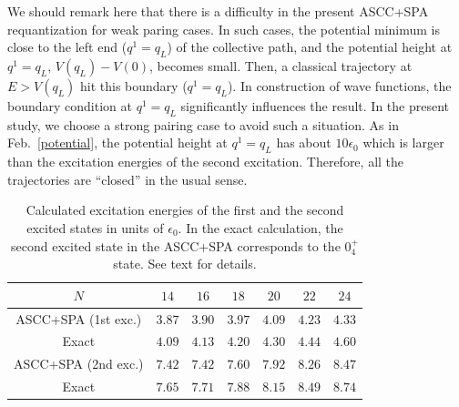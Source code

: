 \documentclass[%
superscriptaddress,
showpacs,
nofootinbib,
amsmath,amssymb,
aps,
prc,
twocolumn,
floatfix ]%
{revtex4-1}
\begin{document}
We should remark here that there is a difficulty in the present ASCC+SPA
requantization for weak paring cases.
In such cases, the potential minimum is close to the left end 
($q^1=q_L$) of the collective path, and the potential height
at $q^1=q_L$, $V(q_L) - V(0)$, becomes small.
Then, a classical trajectory at $E>V(q_L)$ hit this boundary ($q^1=q_L$).
In construction of wave functions,
the boundary condition at $q^1=q_L$ significantly influences the result.
In the present study, we choose a strong pairing case to avoid
such a situation.
As in Feb.~\ref{potential}, the potential height at $q^1=q_L$ has
about $10\epsilon_0$ which is larger than the excitation energies
of the second excitation.
Therefore, all the trajectories are ``closed'' in the usual sense.

\begin{table}[htbp]
\begin{ruledtabular}
\begin{tabular}{c|cccccc}
            $N$ & $14$ & $16$ & $18$ & $20$ & $22$ & $24$\\ \hline
ASCC+SPA (1st exc.) & $3.87$ & $3.90$ & $3.97$ & $4.09$ & $4.23$ & $4.33$\\
    Exact & $4.09$ & $4.13$ & $4.20$ & $4.30$ & $4.44$ & $4.60$\\ \hline
ASCC+SPA (2nd exc.)& $7.42$ & $7.42$ & $7.60$ & $7.92$ & $8.26$ & $8.47$\\
Exact & $7.65$ & $7.71$ & $7.88$ & $8.15$ & $8.49$ & $8.74$
\end{tabular}
\end{ruledtabular}
\caption{Calculated excitation energies of the first and the second
excited states in units of $\epsilon_0$.
In the exact calculation, the second excited state in the ASCC+SPA
corresponds to the $0_4^+$ state.
See text for details.}
\label{ex}
\end{table}
\end{document}
